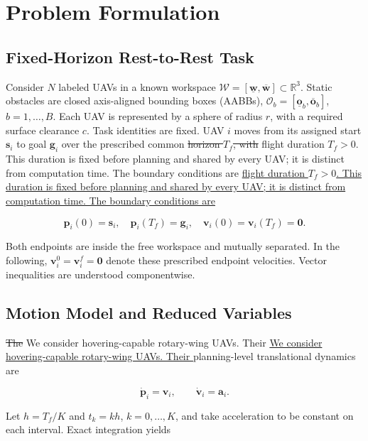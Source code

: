 \documentclass[electronics,article,submit,moreauthors]{Definitions/mdpi}
\newcommand{\R}{\mathbb{R}}
\newcommand{\bp}{\mathbf{p}}
\newcommand{\bv}{\mathbf{v}}
\newcommand{\ba}{\mathbf{a}}
\providecommand{\DIFadd}[1]{{\protect\color{RevisionBlue}\ifmmode #1\else\uline{#1}\fi}} %
\providecommand{\DIFdel}[1]{{\protect\color{RevisionRed}\ifmmode\text{\sout{\ensuremath{#1}}}\else\sout{#1}\fi}} %
\providecommand{\DIFaddbegin}{}\providecommand{\DIFaddend}{} %
\providecommand{\DIFdelbegin}{}\providecommand{\DIFdelend}{} %
\begin{document}
\section{Problem Formulation}

\label{sec:formulation}

\subsection{Fixed-Horizon Rest-to-Rest Task}

Consider $N$ labeled UAVs in a known workspace $\mathcal W=[\underline{\mathbf w},\overline{\mathbf w}]\subset\R^3$. Static obstacles are closed axis-aligned bounding boxes (AABBs), $\mathcal O_b=[\underline{\mathbf o}_b,\overline{\mathbf o}_b]$, $b=1,\ldots,B$. Each UAV is represented by a sphere of radius $r$, with a required surface clearance $c$. Task identities are fixed. UAV $i$ moves from its assigned start $\mathbf s_i$ to goal $\mathbf g_i$ over the prescribed common \DIFdelbegin \DIFdel{horizon $T_f$, with
}\DIFdelend \DIFaddbegin \DIFadd{flight duration $T_f>0$. This duration is fixed before planning and shared by every UAV; it is distinct from computation time. The boundary conditions are
}\DIFaddend 

\begin{equation}
 \bp_i(0)=\mathbf s_i,\quad \bp_i(T_f)=\mathbf g_i,\quad
 \bv_i(0)=\bv_i(T_f)=\mathbf0 .
 \label{eq:endpoint}
\end{equation}

Both endpoints are inside the free workspace and mutually separated. In the following, $\bv_i^0=\bv_i^f=\mathbf0$ denote these prescribed endpoint velocities. Vector inequalities are understood componentwise.


\subsection{Motion Model and Reduced Variables}

\DIFdelbegin \DIFdel{The }\DIFdelend \DIFaddbegin \DIFadd{We consider hovering-capable rotary-wing UAVs. Their }\DIFaddend planning-level translational dynamics are

\begin{equation}
 \dot{\bp}_i=\bv_i,\qquad \dot{\bv}_i=\ba_i.
 \label{eq:continuous}
\end{equation}

Let $h=T_f/K$ and $t_k=kh$, $k=0,\ldots,K$, and take acceleration to be constant on each interval. Exact integration yields
\end{document}
